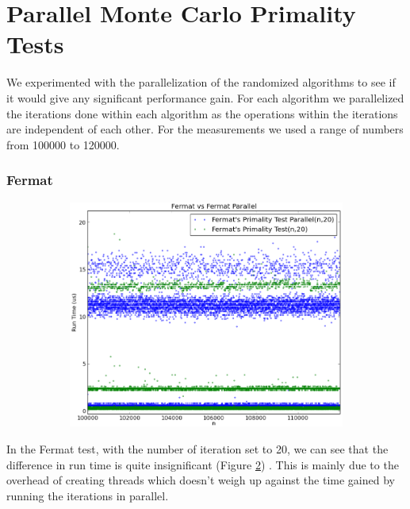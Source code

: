 \documentclass[compressed,final,notitlepage,narroweqnarray,inline,twoside,]{ieee}
\begin{document}
\section{Parallel Monte Carlo Primality Tests}
We experimented with the parallelization of the randomized algorithms to see if it would give any significant performance gain. For each algorithm we parallelized the iterations done within each algorithm as the operations within the iterations are independent of each other. For the measurements we used a range of numbers from 100000 to 120000.
\subsubsection{Fermat}
\begin{figure}
        \centering
        \begin{subfigure}[b]{0.5\textwidth}
                \includegraphics[width=\textwidth]{../images/FPT_FPTP_runtime}
                \label{fig:gull}
        \end{subfigure}
        \vspace{-30pt}\caption{}\label{fig:fermat_p_comparison_small}
\end{figure}
In the Fermat test, with the number of iteration set to 20, we can see that the difference in run time is quite insignificant (Figure \ref{fig:fermat_p_comparison_small}) . This is mainly due to the overhead of creating threads which doesn’t weigh up against the time gained by running the iterations in parallel. 
\end{document}
